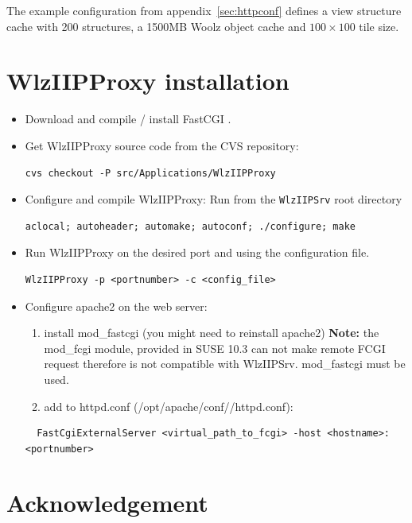 \documentclass[11pt]{article}
\begin{document}
The example configuration from appendix~\ref{sec:httpconf} defines a view
structure cache with 200 structures, a 1500MB Woolz object cache
and $100\times100$ tile size.

\section{WlzIIPProxy installation}
\label{sec:fcgi:install}

\begin{itemize}
\item Download and compile / install FastCGI \cite{LIBFCGI}.

\item Get WlzIIPProxy source code from the CVS repository:
\begin{verbatim}
cvs checkout -P src/Applications/WlzIIPProxy
\end{verbatim}

\item Configure and compile WlzIIPProxy:
Run from the \texttt{WlzIIPSrv} root directory
\begin{verbatim}
aclocal; autoheader; automake; autoconf; ./configure; make
\end{verbatim}


\item Run WlzIIPProxy on the desired port and using the configuration file.
\begin{verbatim}
WlzIIPProxy -p <portnumber> -c <config_file>
\end{verbatim}

\item Configure apache2 on the web server:
\begin{enumerate}
  \item install mod\_fastcgi (you might need to reinstall apache2)
  \textbf{Note:} the mod\_fcgi module, provided in SUSE 10.3 can not make
  remote FCGI request therefore is not compatible with WlzIIPSrv.
  mod\_fastcgi must be used.
  \item add to httpd.conf (/opt/apache/conf//httpd.conf):
\end{enumerate}
\begin{verbatim}
  FastCgiExternalServer <virtual_path_to_fcgi> -host <hostname>:<portnumber>
\end{verbatim}
\end{itemize}

\section{Acknowledgement}
\end{document}
